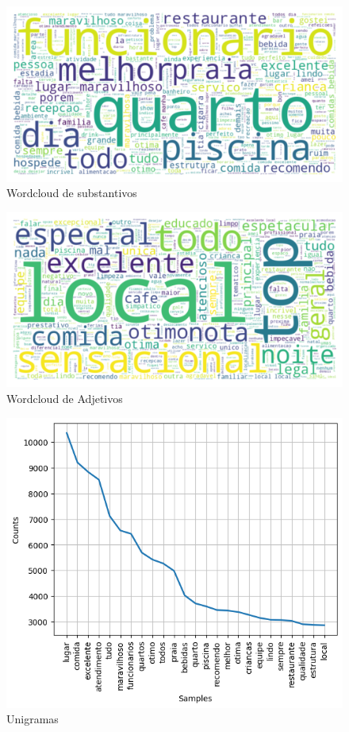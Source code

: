 \begin{figure}
	\centering
	\includegraphics[width=1\textwidth]{figs/exploratoria/wordcloud_substantivos.png}
	\caption{Wordcloud de substantivos}
	\label{img:wordcloud_substantivos}
\end{figure}

\begin{figure}
	\centering
	\includegraphics[width=1\textwidth]{figs/exploratoria/wordcloud_adjetivos.png}
	\caption{Wordcloud de Adjetivos}
	\label{img:wordcloud_adjetivos}
\end{figure}

\begin{figure}
	\centering
	\includegraphics[width=1\textwidth]{figs/exploratoria/unigramas.png}
	\caption{Unigramas}
	\label{img:unigramas}
\end{figure}

